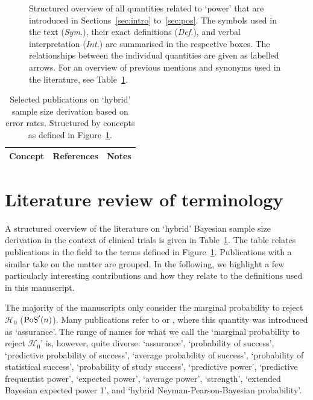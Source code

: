 \documentclass{article}
\begin{document}
\begin{figure}
\centering
\resizebox{0.925\textwidth}{!}{}
\caption{Structured overview of all quantities related to `power' that are introduced in Sections~\ref{sec:intro} to~\ref{sec:pos}. The symbols used in the text (\textit{Sym.}), their exact definitions (\textit{Def.}), and verbal interpretation (\textit{Int.}) are summarised in the respective boxes. The relationships between the individual quantities are given as labelled arrows.
For an overview of previous mentions and synonyms used in the literature, see Table~\ref{tab:literature-overview}.}
\label{fig:diagram}
\end{figure}

\newpage
\begin{center}
\renewcommand{\arraystretch}{1.5}
\begin{longtable}{p{3cm}p{4cm}p{8cm}}
    \caption{%
        Selected publications on `hybrid' sample size derivation based on error rates. Structured by concepts as defined in Figure~\protect\ref{fig:diagram}.
    }%
    \label{tab:literature-overview}\\

    \textbf{Concept} & \textbf{References} & \textbf{Notes} \\
    \hline
    \endfirsthead

    

\end{longtable}
\end{center}



\section{Literature review of terminology}
\label{sec:literature}

A structured overview of the literature on `hybrid' Bayesian sample size derivation in the context of clinical trials is given
in Table~\ref{tab:literature-overview}.
The table relates publications in the field to the terms defined
in Figure~\ref{fig:diagram}.
Publications with a similar take on the matter are grouped.
In the following, we highlight a few particularly interesting contributions and how they relate to the definitions used in this manuscript.

The majority of the manuscripts only consider
the marginal probability to reject $\mathcal{H}_0$ ($\operatorname{PoS}'(n)$).
Many publications refer to \citet{o2001bayesian} or \citet{ohagan-2005},
where this quantity was introduced as `assurance'.
The range of names for what we call the `marginal probability to reject $\mathcal{H}_0$' is, however, quite diverse:
`assurance', `probability of success',
`predictive probability of success', `average probability of success', `probability of statistical success', `probability of study success', `predictive power', `predictive frequentist power', `expected power', `average power', `strength', `extended Bayesian expected power 1', and `hybrid Neyman-Pearson-Bayesian probability'.
\end{document}
